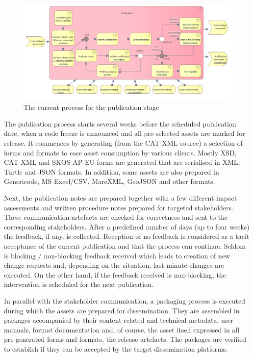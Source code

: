 	\label{sec:publication-current}
		\begin{figure}[h]
		\centering
		\includegraphics[width=1.03\textwidth]{images/business/current/Publication.png}
		\caption{The current process for the publication stage}
		\label{fig:publication-current}
	\end{figure}

	The publication process starts several weeks before the scheduled publication date, when a code freeze is announced and all pre-selected assets are marked for release. It commences by generating (from the CAT-XML source) a selection of forms and formats to ease asset consumption by various clients. Mostly XSD, CAT-XML and SKOS-AP-EU forms are generated that are serialised in XML, Turtle and JSON formats. In addition, some assets are also prepared in Genericode, MS Excel/CSV, MarcXML, GeoJSON and other formats. 
	
	Next, the publication notes are prepared together with a few different impact assessments and written procedure notes prepared for targeted stakeholders. These communication artefacts are checked for correctness and sent to the corresponding stakeholders. After a predefined number of days (up to four weeks) the feedback, if any, is collected. Reception of no feedback is considered as a tacit acceptance of the current publication and that the process can continue. Seldom is blocking / non-blocking feedback received which leads to creation of new change requests and, depending on the situation, last-minute changes are executed. On the other hand, if the feedback received is non-blocking, the intervention is scheduled for the next publication. 
	
	In parallel with the stakeholder communication, a packaging process is executed during which the assets are prepared for dissemination. They are assembled in packages accompanied by their content-related and technical metadata, user manuals, format documentation and, of course, the asset itself expressed in all pre-generated forms and formats, the release artefacts. The packages are verified to establish if they can be accepted by the target dissemination platforms.
	
